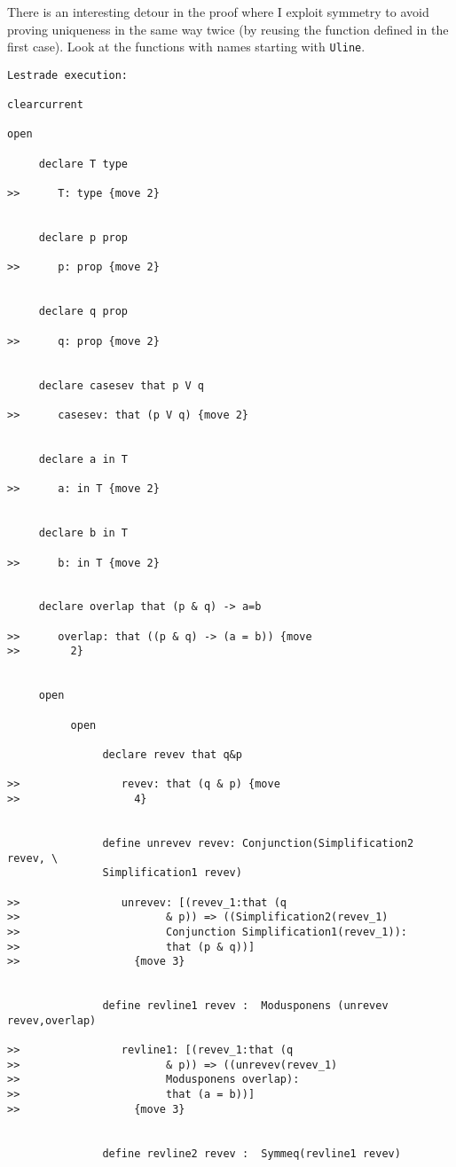\documentclass[12pt]{article}
\begin{document}
There is an interesting detour in the proof where I exploit symmetry to avoid proving uniqueness in the same way twice (by reusing the function defined in the first case).
Look at the functions with names starting with {\tt Uline}.

\begin{verbatim}Lestrade execution:

clearcurrent

open

     declare T type

>>      T: type {move 2}


     declare p prop

>>      p: prop {move 2}


     declare q prop

>>      q: prop {move 2}


     declare casesev that p V q

>>      casesev: that (p V q) {move 2}


     declare a in T

>>      a: in T {move 2}


     declare b in T

>>      b: in T {move 2}


     declare overlap that (p & q) -> a=b

>>      overlap: that ((p & q) -> (a = b)) {move 
>>        2}


     open

          open

               declare revev that q&p

>>                revev: that (q & p) {move 
>>                  4}


               define unrevev revev: Conjunction(Simplification2 revev, \
               Simplification1 revev)

>>                unrevev: [(revev_1:that (q 
>>                       & p)) => ((Simplification2(revev_1) 
>>                       Conjunction Simplification1(revev_1)):
>>                       that (p & q))]
>>                  {move 3}


               define revline1 revev :  Modusponens (unrevev revev,overlap)

>>                revline1: [(revev_1:that (q 
>>                       & p)) => ((unrevev(revev_1) 
>>                       Modusponens overlap):
>>                       that (a = b))]
>>                  {move 3}


               define revline2 revev :  Symmeq(revline1 revev)


\end{verbatim}
\end{document}
